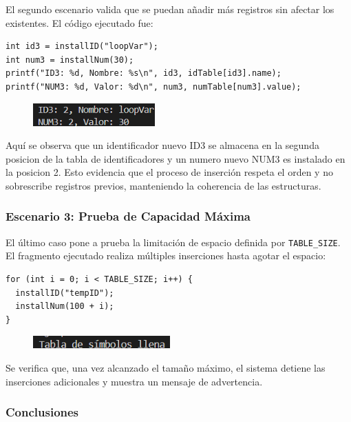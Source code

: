 \documentclass{article}
\begin{document}
El segundo escenario valida que se puedan añadir más registros sin afectar los existentes. El código ejecutado fue:

\begin{verbatim}
int id3 = installID("loopVar");
int num3 = installNum(30);
printf("ID3: %d, Nombre: %s\n", id3, idTable[id3].name);
printf("NUM3: %d, Valor: %d\n", num3, numTable[num3].value);
\end{verbatim}

\begin{figure}[H]
    \centering
    \includegraphics[width=0.5\linewidth]{image2.png}
\end{figure}

Aquí se observa que un identificador nuevo ID3 se almacena en la segunda posicion de la tabla de identificadores y un numero nuevo NUM3 es instalado en la posicion 2. Esto evidencia que el proceso de inserción respeta el orden y no sobrescribe registros previos, manteniendo la coherencia de las estructuras.
 
\subsubsection{Escenario 3: Prueba de Capacidad Máxima}

El último caso pone a prueba la limitación de espacio definida por \texttt{TABLE\_SIZE}. El fragmento ejecutado realiza múltiples inserciones hasta agotar el espacio:

\begin{verbatim}
for (int i = 0; i < TABLE_SIZE; i++) {
  installID("tempID");
  installNum(100 + i);
}
\end{verbatim}

\begin{figure}[H]
    \centering
    \includegraphics[width=0.5\linewidth]{image3.png}
\end{figure}

Se verifica que, una vez alcanzado el tamaño máximo, el sistema detiene las inserciones adicionales y muestra un mensaje de advertencia.

\subsubsection{Conclusiones}
\end{document}

